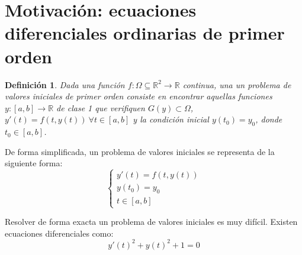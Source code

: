 \documentclass{article}
\theoremstyle{theorem-style}  %
\theoremstyle{definition-style}
\newtheorem{definition}{Definición}[section]
\theoremstyle{example-style}
\begin{document}
\makeatletter\renewcommand{\ALG@name}{Algoritmo}

\maketitle



\newpage
\tableofcontents
\newpage


\section{Motivación: ecuaciones diferenciales ordinarias de primer orden} \label{sec:motivacion}

	\begin{definition}
		Dada una función $f:\Omega \subseteq \mathbb R^2  \to \mathbb{R}$ continua, una un problema de valores iniciales de primer orden consiste en encontrar aquellas funciones $y: [a,b] \rightarrow \mathbb{R}$ de clase 1 que verifiquen $G(y) \subset \Omega$, $y'(t) = f(t,y(t)) \ \forall t \in [a,b]$ y la condición inicial $y(t_0) = y_0$, donde $t_0 \in [a,b]$.
	\end{definition}

	De forma simplificada, un problema de valores iniciales se representa de la siguiente forma:
	\begin{equation*}
		\begin{cases}
			y'(t) = f(t,y(t)) \\
			y(t_0) = y_0 \\
			t \in [a,b]
		\end{cases}
	\end{equation*}

	Resolver de forma exacta un problema de valores iniciales es muy difícil. Existen ecuaciones diferenciales como:
	\begin{equation}
	y'(t)^2 + y(t)^2 + 1 = 0
	\end{equation}
\end{document}
